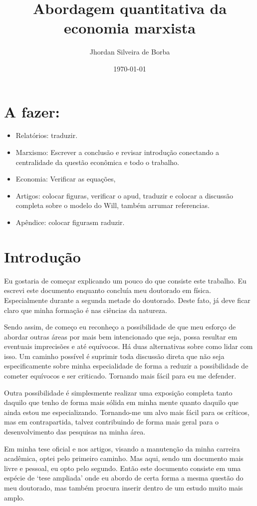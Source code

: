 \documentclass{article}
\title{Abordagem quantitativa da economia marxista}
\author{Jhordan Silveira de Borba}
\date{\today}
\begin{document}
\maketitle
\tableofcontents
\newpage

\section*{A fazer:}

\begin{itemize}
\item Relatórios: traduzir.
\item Marxismo: Escrever a conclusão e revisar introdução conectando a centralidade da questão econômica e todo o trabalho.
\item Economia: Verificar as equações,
\item Artigos: colocar figuras, verificar o apud, traduzir e colocar a discussão completa sobre o modelo do Will, também arrumar referencias.
\item Apêndice: colocar figurasm raduzir.
\end{itemize}

\newpage
\section{Introdução}
Eu gostaria de começar explicando um pouco do que consiste este trabalho. Eu escrevi este documento enquanto concluía meu doutorado em física. Especialmente durante a segunda metade do doutorado. Deste fato, já deve ficar claro que minha formação é nas ciências da natureza.

Sendo assim, de começo eu reconheço a possibilidade de que meu esforço de abordar outras áreas por mais bem intencionado que seja, possa resultar em eventuais imprecisões e até equívocos. Há duas alternativas sobre como lidar com isso. Um caminho possível é suprimir toda discussão direta que não seja especificamente sobre minha especialidade de forma a reduzir a possibilidade de cometer equívocos e ser criticado. Tornando mais fácil para eu me defender.

Outra possibilidade é simplesmente realizar uma exposição completa tanto daquilo que tenho de forma mais sólida em minha mente quanto daquilo que ainda estou me especializando. Tornando-me um alvo mais fácil para os críticos, mas em contrapartida, talvez contribuindo de forma mais geral para o desenvolvimento das pesquisas na minha área.

Em minha tese oficial e nos artigos, visando a manutenção da minha carreira acadêmica, optei pelo primeiro caminho. Mas aqui, sendo um documento mais livre e pessoal, eu opto pelo segundo. Então este documento consiste em uma espécie de `tese ampliada' onde eu abordo de certa forma a mesma questão do meu doutorado, mas também procura inserir dentro de um estudo muito mais amplo.
\end{document}
